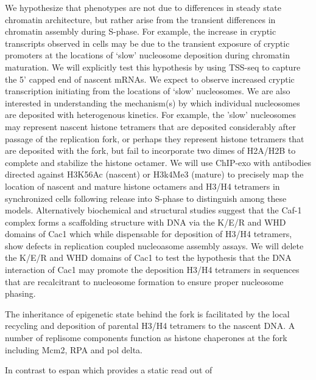 We hypothesize that \cac phenotypes are not due to differences in steady state chromatin architecture, but rather arise from the transient differences in chromatin assembly during S-phase.  For example, the increase in cryptic transcripts observed in \cac cells may be due to the transient exposure of cryptic promoters at the locations of `slow' nucleosome deposition during chromatin maturation.  We will explicitly test this hypothesis by using TSS-seq to capture the 5' capped end of nascent mRNAs\citep{}.  We expect to observe increased cryptic transcription initiating from the locations of `slow' nucleosomes.  We are also interested in understanding the mechanism(s) by which individual nucleosomes are deposited with heterogenous kinetics.  For example, the 'slow' nucleosomes may represent nascent histone tetramers that are deposited considerably after passage of the replication fork, or perhaps they represent histone tetramers that are deposited with the fork, but fail to incorporate two dimes of H2A/H2B to complete and stabilize the histone octamer.  We will use ChIP-exo with antibodies directed against H3K56Ac (nascent) or H3k4Me3 (mature) to precisely map the location of nascent and mature histone octamers and H3/H4 tetramers in synchronized cells following release into S-phase to distinguish among these models.  Alternatively biochemical and structural studies suggest that the Caf-1 complex forms a scaffolding structure with DNA via the K/E/R and WHD domains of Cac1 which while dispensable for \invitro deposition of H3/H4 tetramers, show defects in replication coupled nucleoasome assembly assays\citep{Sauer2018-gr, Sauer2017-es}.  We will delete the K/E/R and WHD domains of Cac1 to test the hypothesis that the DNA interaction of Cac1 may promote the deposition H3/H4 tetramers in sequences that are recalcitrant  to nucleosome formation\citep{Segal2006-tj} to ensure proper nucleosome phasing.  

The inheritance of epigenetic state behind the fork is facilitated by the local recycling and deposition of parental H3/H4 tetramers to the nascent DNA.  A number of replisome components function as histone chaperones at the fork including Mcm2, RPA and pol delta.  

In contrast to espan which provides a static read out of 




